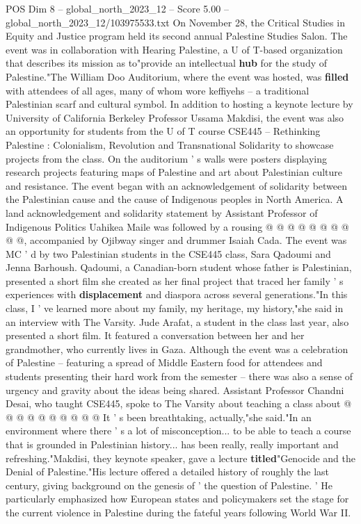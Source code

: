 \begin{textsample}{POS Dim 8 – global\_north\_2023\_12 – Score 5.00 – global\_north\_2023\_12/103975533.txt}  \label{ex:f8_pos_272}
On November 28, the Critical Studies in Equity and Justice program held its second annual Palestine Studies Salon.
The event was in collaboration with Hearing Palestine, a U of T-based organization that describes its mission as to"provide an intellectual \textbf{hub} for the study of Palestine."The William Doo Auditorium, where the event was hosted, was \textbf{filled} with attendees of all ages, many of whom wore keffiyehs -- a traditional Palestinian scarf and cultural symbol.
In addition to hosting a keynote lecture by University of California Berkeley Professor Ussama Makdisi, the event was also an opportunity for students from the U of T course CSE445 -- Rethinking Palestine : Colonialism, Revolution and Transnational Solidarity to showcase projects from the class.
On the auditorium ' s walls were posters displaying research projects featuring maps of Palestine and art about Palestinian culture and resistance.
The event began with an acknowledgement of solidarity between the Palestinian cause and the cause of Indigenous peoples in North America.
A land acknowledgement and solidarity statement by Assistant Professor of Indigenous Politics Uahikea Maile was followed by a rousing @ @ @ @ @ @ @ @ @ @, accompanied by Ojibway singer and drummer Isaiah Cada.
The event was MC ' d by two Palestinian students in the CSE445 class, Sara Qadoumi and Jenna Barhoush.
Qadoumi, a Canadian-born student whose father is Palestinian, presented a short film she created as her final project that traced her family ' s experiences with \textbf{displacement} and diaspora across several generations."In this class, I ' ve learned more about my family, my heritage, my history,"she said in an interview with The Varsity.
Jude Arafat, a student in the class last year, also presented a short film.
It featured a conversation between her and her grandmother, who currently lives in Gaza.
Although the event was a celebration of Palestine -- featuring a spread of Middle Eastern food for attendees and students presenting their hard work from the semester -- there was also a sense of urgency and gravity about the ideas being shared.
Assistant Professor Chandni Desai, who taught CSE445, spoke to The Varsity about teaching a class about @ @ @ @ @ @ @ @ @ @ It ' s been breathtaking, actually,"she said."In an environment where there ' s a lot of misconception... to be able to teach a course that is grounded in Palestinian history... has been really, really important and refreshing."Makdisi, they keynote speaker, gave a lecture \textbf{titled}"Genocide and the Denial of Palestine."His lecture offered a detailed history of roughly the last century, giving background on the genesis of ' the question of Palestine. ' He particularly emphasized how European states and policymakers set the stage for the current violence in Palestine during the fateful years following World War II.

\end{textsample}
